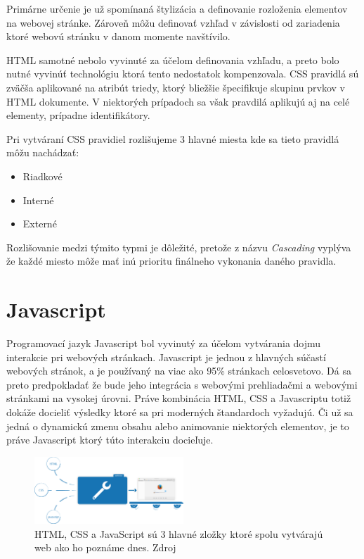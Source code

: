 Primárne určenie je už spomínaná štylizácia a definovanie rozloženia elementov na webovej stránke. Zároveň môžu definovať vzhľad v závislosti od zariadenia ktoré webovú stránku v danom momente navštívilo. 

HTML samotné nebolo vyvinuté za účelom definovania vzhľadu, a preto bolo nutné vyvinúť technológiu ktorá tento nedostatok kompenzovala. CSS pravidlá sú zväčša aplikované na atribút triedy, ktorý bliežšie špecifikuje skupinu prvkov v HTML dokumente. V niektorých prípadoch sa však pravdilá aplikujú aj na celé elementy, prípadne identifikátory.\cite{CSSIntro}

Pri vytváraní CSS pravidiel rozlišujeme 3 hlavné miesta kde sa tieto pravidlá môžu nachádzať:

\begin{itemize}
    \item {Riadkové}
    \item {Interné}
    \item {Externé}
\end{itemize}

Rozlišovanie medzi týmito typmi je dôležité, pretože z názvu \textit{Cascading} vyplýva že každé miesto môže mať inú prioritu finálneho vykonania daného pravidla.

\section{Javascript}

Programovací jazyk Javascript bol vyvinutý za účelom vytvárania dojmu interakcie pri webových stránkach. Javascript je jednou z hlavných súčastí webových stránok, a je používaný na viac ako 95\% stránkach celosvetovo.\cite{HowPopular} Dá sa preto predpokladať že bude jeho integrácia s webovými prehliadačmi a webovými stránkami na vysokej úrovni.
\newpage
Práve kombinácia HTML, CSS a Javascriptu totiž dokáže docieliť výsledky ktoré sa pri moderných štandardoch vyžadujú. Či už sa jedná o dynamickú zmenu obsahu alebo animovanie niektorých elementov, je to práve Javascript ktorý túto interakciu docieľuje. \cite{Javascript}

\begin{figure}[hbt]
	\centering
	\includegraphics[width=0.5\textwidth]{obrazky-figures/jsexecution.png}
	\caption{HTML, CSS a JavaScript sú 3 hlavné zložky ktoré spolu vytvárajú web ako ho poznáme dnes. Zdroj \cite{Javascript}}
	\label{Jsexecution_img}
\end{figure}

